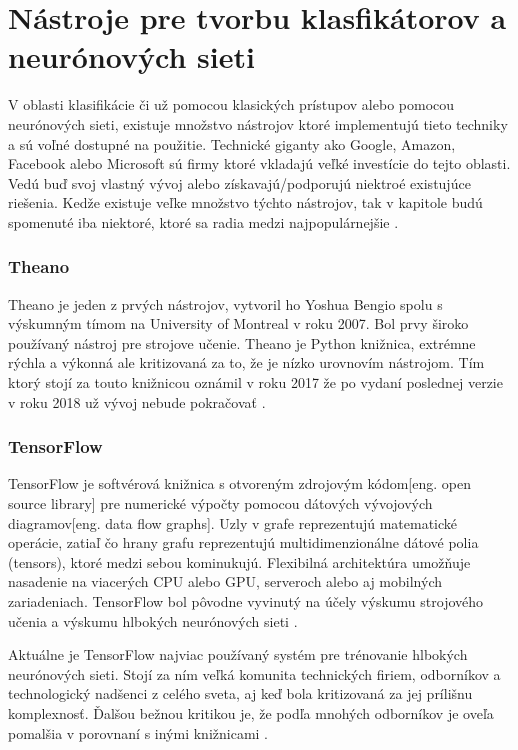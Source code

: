 
\section{Nástroje pre tvorbu klasfikátorov a neurónových sieti}
\label{sec:frameworks}
V oblasti klasifikácie či už pomocou klasických prístupov alebo pomocou neurónových sieti, existuje množstvo nástrojov
    ktoré implementujú tieto techniky a sú voľné dostupné na použitie.
Technické giganty ako Google, Amazon, Facebook alebo Microsoft sú firmy ktoré vkladajú veľké investície do tejto oblasti.
Vedú buď svoj vlastný vývoj alebo získavajú/podporujú niektroé existujúce riešenia.
Kedže existuje veľke množstvo týchto nástrojov, tak v kapitole budú spomenuté iba niektoré, ktoré sa radia medzi najpopulárnejšie \cite{odkaz:FrameworkComparison}.

\subsubsection{Theano}

Theano je jeden z prvých nástrojov, vytvoril ho Yoshua Bengio spolu s výskumným tímom na University of Montreal v roku 2007.
Bol prvy široko používaný nástroj pre strojove učenie.
Theano je Python knižnica, extrémne rýchla a výkonná ale kritizovaná za to, že je nízko urovnovím nástrojom.
Tím ktorý stojí za touto knižnicou oznámil v roku 2017 že po vydaní poslednej verzie v roku 2018 už vývoj nebude pokračovať \cite{odkaz:FrameworkComparison}.

\subsubsection{TensorFlow}

TensorFlow je softvérová knižnica s otvoreným zdrojovým kódom[eng. open source library] pre numerické výpočty pomocou dátových vývojových diagramov[eng. data flow graphs].
Uzly v grafe reprezentujú matematické operácie, zatiaľ čo hrany grafu reprezentujú multidimenzionálne dátové polia (tensors), ktoré medzi sebou kominukujú.
Flexibilná architektúra umožňuje nasadenie na viacerých CPU alebo GPU, serveroch alebo aj mobilných zariadeniach.
TensorFlow bol pôvodne vyvinutý na účely výskumu strojového učenia a výskumu hlbokých neurónových sieti \cite{odkaz:TensorFlow}.

Aktuálne je TensorFlow najviac používaný systém pre trénovanie hlbokých neurónových sieti.
Stojí za ním veľká komunita technických firiem, odborníkov a technologický nadšenci z celého sveta, aj keď bola kritizovaná za jej prílišnu komplexnosť.
Ďalšou bežnou kritikou je, že podľa mnohých odborníkov je oveľa pomalšia v porovnaní s inými knižnicami \cite{odkaz:FrameworkComparison}.


